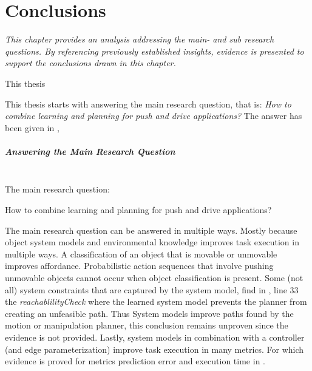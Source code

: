\chapter{Conclusions}%
\label{chap:conclusion}
\textit{This chapter provides an analysis addressing the main- and sub research questions. By referencing previously established insights, evidence is presented to support the conclusions drawn in this chapter.\bs}

This thesis 



This thesis starts with answering the main research question, that is: \textit{How to combine learning and planning for push and drive applications?} The answer has been given in , 



\paragraph{Answering the Main Research Question}\mbox{}\\

The main research question:
\begin{center}
  {\large How to combine learning and planning for push and drive applications?}
\end{center}

The main research question can be answered in multiple ways. Mostly because object system models and environmental knowledge improves task execution in multiple ways. A classification of an object that is movable or unmovable improves affordance. Probabilistic action sequences that involve pushing unmovable objects cannot occur when object classification is present. Some (not all) system constraints that are captured by the system model, find in , line 33 the \textit{reachablilityCheck} where the learned system model prevents the planner from creating an unfeasible path. Thus System models improve paths found by the motion or manipulation planner, this conclusion remains unproven since the evidence is not provided. Lastly, system models in combination with a controller (and edge parameterization) improve task execution in many metrics. For which evidence is proved for metrics prediction error and execution time in .\bs
{}



